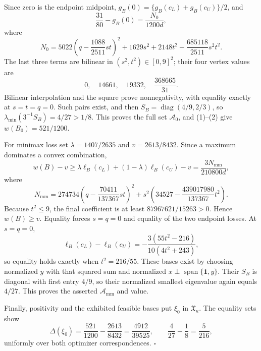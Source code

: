 Since zero is the endpoint midpoint, \(g_B(0)=\{g_B(c_L)+g_B(c_U)\}/2\), and
\[
 \frac{31}{80}-g_B(0)=\frac{N_0}{1200d},
\]
where
\[
 N_0=5022\left(q-\frac{1088}{2511}st\right)^2
 +1629s^2+2148t^2-\frac{685118}{2511}s^2t^2.
\]
The last three terms are bilinear in \((s^2,t^2)\in[0,9]^2\); their four vertex values are
\[
 0,\quad14661,\quad19332,\quad\frac{368665}{31}.
\]
Bilinear interpolation and the square prove nonnegativity, with equality exactly at \(s=t=q=0\).  Such pairs exist, and then \(S_B=\operatorname{diag}(4/9,2/3)\), so \(\lambda_{\min}(3^{-1}S_B)=4/27>1/8\).  This proves the full set \(\mathcal A_0\), and (1)--(2) give \(w(B_0)=521/1200\).

For minimax loss set \(\lambda=1407/2635\) and \(v=2613/8432\).  Since a maximum dominates a convex combination,
\[
 w(B)-v\ge\lambda\ell_B(c_L)+(1-\lambda)\ell_B(c_U)-v
 =\frac{3N_{\mathrm{mm}}}{210800d},
\]
where
\[
 N_{\mathrm{mm}}
 =274734\left(q-\frac{70411}{137367}st\right)^2
 +s^2\left(34527-\frac{439017980}{137367}t^2\right).
\]
Because \(t^2\le9\), the final coefficient is at least \(87967621/15263>0\).  Hence \(w(B)\ge v\).  Equality forces \(s=q=0\) and equality of the two endpoint losses.  At \(s=q=0\),
\[
 \ell_B(c_L)-\ell_B(c_U)
 =-\frac{3(55t^2-216)}{10(4t^2+243)},
\]
so equality holds exactly when \(t^2=216/55\).  These bases exist by choosing normalized \(y\) with that squared sum and normalized \(x\perp\operatorname{span}\{\mathbf1,y\}\).  Their \(S_B\) is diagonal with first entry \(4/9\), so their normalized smallest eigenvalue again equals \(4/27\).  This proves the asserted \(\mathcal A_{\mathrm{mm}}\) and value.

Finally, positivity and the exhibited feasible bases put \(\xi_0\) in \(\mathfrak X_\kappa\).  The equality sets show
\[
 \Delta(\xi_0)=\frac{521}{1200}-\frac{2613}{8432}
 =\frac{4912}{39525},
 \qquad
 \frac4{27}-\frac18=\frac5{216},
\]
uniformly over both optimizer correspondences. \(\square\)